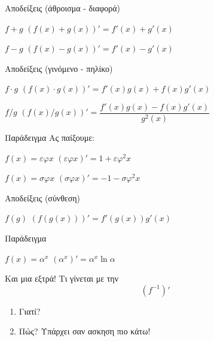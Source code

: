 \documentclass{presentation}
\begin{document}
\begin{frame}{Αποδείξεις (άθροισμα - διαφορά)}
    \begin{block}{$f+g$}
        $(f(x)+g(x))'=f'(x)+g'(x)$
    \end{block} \pause

    \begin{block}{$f-g$}
        $(f(x)-g(x))'=f'(x)-g'(x)$
    \end{block}
\end{frame}

\begin{frame}{Αποδείξεις (γινόμενο - πηλίκο)}
    \begin{block}{$f\cdot g$}
        $(f(x)\cdot g(x))'=f'(x)g(x)+f(x)g'(x)$
    \end{block} \pause

    \begin{block}{$f/g$}
        $(f(x)/g(x))'=\dfrac{f'(x)g(x)-f(x)g'(x)}{g^2(x)}$
    \end{block}
\end{frame}

\begin{frame}{Παράδειγμα}
    Ας παίξουμε:
    \begin{block}{$f(x)=εφx$}
        $(εφx)'=1+εφ^2x$
    \end{block} \pause

    \begin{block}{$f(x)=σφx$}
        $(σφx)'=-1-σφ^2x$
    \end{block}
\end{frame}

\begin{frame}{Αποδείξεις (σύνθεση)}
    \begin{block}{$f(g)$}
        $(f(g(x)))'=f'(g(x))g'(x)$
    \end{block}
\end{frame}

\begin{frame}{Παράδειγμα}
    \begin{block}{$f(x)=α^x$}
        $(α^x)'=α^x\ln α$
    \end{block}
\end{frame}

\begin{frame}{Και μια εξτρά!}
    Τι γίνεται με την $$(f^{-1})'$$
    \begin{enumerate}
        \item Γιατί?
        \item Πώς? Υπάρχει σαν ασκηση πιο κάτω!
    \end{enumerate}
\end{frame}
\end{document}
